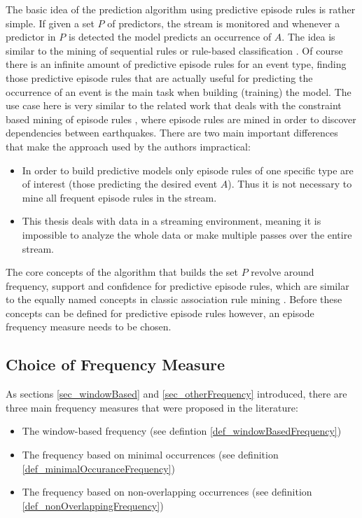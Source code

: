 The basic idea of the prediction algorithm using predictive episode rules is rather simple. If given a set $P$ of predictors, the stream is monitored and whenever a predictor in $P$ is detected the model predicts an occurrence of $A$. The idea is similar to the mining of sequential rules or rule-based classification \cite{ma1998integrating}.
Of course there is an infinite amount of predictive episode rules for an event type, finding those predictive episode rules that are actually useful for predicting the occurrence of an event is the main task when building (training) the model. The use case here is very similar to the related work that deals with the constraint based mining of episode rules \cite{meger2004constraint}, where episode rules are mined in order to discover dependencies between earthquakes. There are two main important differences that make the approach used by the authors impractical:

\begin{itemize}
 \item In order to build predictive models only episode rules of one specific type are of interest (those predicting the desired event $A$). Thus it is not necessary to mine all frequent episode rules in the stream.
 \item This thesis deals with data in a streaming environment, meaning it is impossible to analyze the whole data or make multiple passes over the entire stream.
\end{itemize}

The core concepts of the algorithm that builds the set $P$ revolve around frequency, support and confidence for predictive episode rules, which are similar to the equally named concepts in classic association rule mining \cite{agrawal1994fast}. Before these concepts can be defined for predictive episode rules however, an episode frequency measure needs to be chosen. 

\subsection{Choice of Frequency Measure}

As sections \ref{sec_windowBased} and \ref{sec_otherFrequency} introduced, there are three main frequency measures that were proposed in the literature:

\begin{itemize}
	\item The window-based frequency (see defintion \ref{def_windowBasedFrequency})
	\item The frequency based on minimal occurrences (see definition \ref{def_minimalOccuranceFrequency})
	\item The frequency based on non-overlapping occurrences (see definition \ref{def_nonOverlappingFrequency})
\end{itemize}

